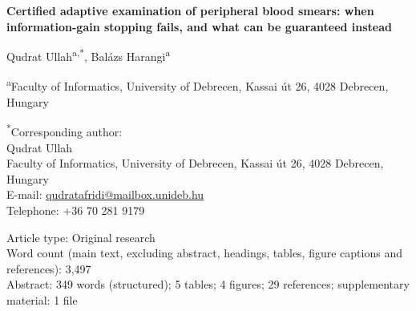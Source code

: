 \documentclass[12pt]{article}
\begin{document}
\doublespacing
\begin{center}
{\large\bfseries Certified adaptive examination of peripheral blood smears: when information-gain stopping fails, and what can be guaranteed instead}
\end{center}

\bigskip
\noindent Qudrat Ullah\textsuperscript{a,*}, Balázs Harangi\textsuperscript{a}

\medskip
\noindent\textsuperscript{a}Faculty of Informatics, University of Debrecen, Kassai út 26, 4028 Debrecen, Hungary

\bigskip
\noindent\textsuperscript{*}Corresponding author:\\
Qudrat Ullah\\
Faculty of Informatics, University of Debrecen, Kassai út 26, 4028 Debrecen, Hungary\\
E-mail: \href{mailto:qudratafridi@mailbox.unideb.hu}{qudratafridi@mailbox.unideb.hu}\\
Telephone: +36 70 281 9179

\bigskip
\noindent Article type: Original research\\
Word count (main text, excluding abstract, headings, tables, figure captions and references): 3,497\\
Abstract: 349 words (structured); 5 tables; 4 figures; 29 references; supplementary material: 1 file
\end{document}
